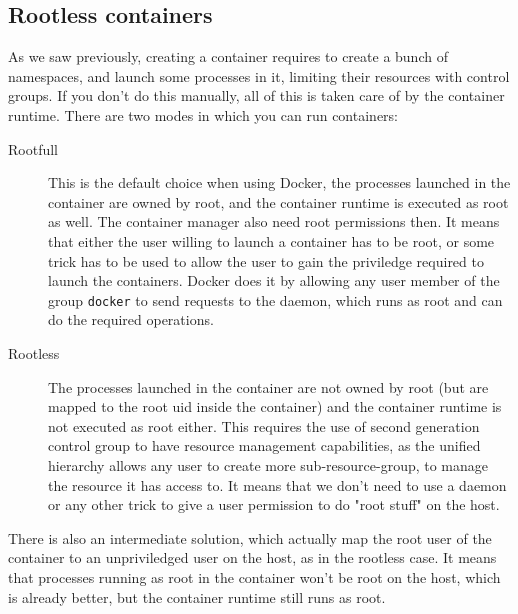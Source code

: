 \subsection{Rootless containers}
As we saw previously, creating a container requires to create a bunch of namespaces, and launch some processes in it, limiting their resources with control groups.  If you don't do this manually, all of this is taken care of by the container runtime.  There are two modes in which you can run containers:
\begin{description}
  \item[Rootfull]  This is the default choice when using Docker, the processes launched in the container are owned by root, and the container runtime is executed as root as well.  The container manager also need root permissions then.  It means that either the user willing to launch a container has to be root, or some trick has to be used to allow the user to gain the priviledge required to launch the containers.  Docker does it by allowing any user member of the group \texttt{docker} to send requests to the daemon, which runs as root and can do the required operations.
  \item[Rootless] The processes launched in the container are not owned by root (but are mapped to the root uid inside the container) and the container runtime is not executed as root either.  This requires the use of second generation control group to have resource management capabilities, as the unified hierarchy allows any user to create more sub-resource-group, to manage the resource it has access to.  It means that we don't need to use a daemon or any other trick to give a user permission to do "root stuff" on the host.
\end{description}
There is also an intermediate solution, which actually map the root user of the container to an unpriviledged user on the host, as in the rootless case.  It means that processes running as root in the container won't be root on the host, which is already better, but the container runtime still runs as root.


